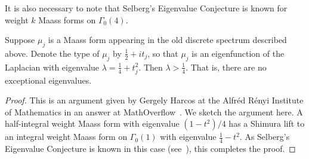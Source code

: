 It is also necessary to note that Selberg's Eigenvalue Conjecture is known for weight $k$
Maass forms on $\Gamma_0(4)$.


\begin{lemma}
  Suppose $\mu_j$ is a Maass form appearing in the old discrete spectrum described above.
  Denote the type of $\mu_j$ by $\frac{1}{2} + it_j$, so that $\mu_j$ is an eigenfunction
  of the Laplacian with eigenvalue $\lambda = \frac{1}{4} + t_j^2$.
  Then $\lambda > \frac{1}{4}$.
  That is, there are no exceptional eigenvalues.
\end{lemma}


\begin{proof}
  This is an argument given by Gergely Harcos at the Alfr\'ed R\'enyi Institute of
  Mathematics in an answer at MathOverflow~\cite{GHfromMO}.
  We sketch the argument here.
  A half-integral weight Maass form with eigenvalue $(1 - t^2)/4$ has a Shimura lift to an
  integral weight Maass form on $\Gamma_0(1)$ with eigenvalue $\frac{1}{4} - t^2$.
  As Selberg's Eigenvalue Conjecture is known in this case (see~\cite{Blomer2013}), this
  completes the proof.
\end{proof}


